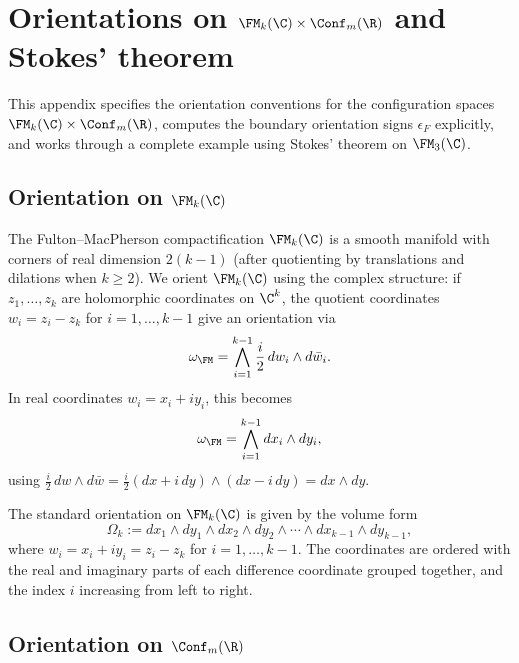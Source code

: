 \section{Orientations on $\FM_k(\C)\times \Conf_m(\R)$ and Stokes' theorem}
\label{app:orientations}

This appendix specifies the orientation conventions for the configuration spaces $\FM_k(\C) \times \Conf_m(\R)$, computes the boundary orientation signs $\epsilon_F$ explicitly, and works through a complete example using Stokes' theorem on $\FM_3(\C)$.

\subsection{Orientation on $\FM_k(\C)$}
\label{subsec:orient-FM}

The Fulton--MacPherson compactification $\FM_k(\C)$ is a smooth manifold with corners of real dimension $2(k-1)$ (after quotienting by translations and dilations when $k \geq 2$). We orient $\FM_k(\C)$ using the complex structure: if $z_1,\ldots,z_k$ are holomorphic coordinates on $\C^k$, the quotient coordinates $w_i = z_i - z_k$ for $i=1,\ldots,k-1$ give an orientation via
\begin{equation}
\label{eq:orient-FM-form}
\omega_{\FM} = \bigwedge_{i=1}^{k-1} \frac{i}{2}\, dw_i \wedge d\bar{w}_i.
\end{equation}
In real coordinates $w_i = x_i + iy_i$, this becomes
\[
\omega_{\FM} = \bigwedge_{i=1}^{k-1} dx_i \wedge dy_i,
\]
using $\frac{i}{2}\,dw \wedge d\bar{w} = \frac{i}{2}(dx+i\,dy)\wedge(dx - i\,dy) = dx\wedge dy$.

\begin{convention}
\label{conv:coord-ordering}
The standard orientation on $\FM_k(\C)$ is given by the volume form
\begin{equation}
\label{eq:vol-FM}
\Omega_k := dx_1 \wedge dy_1 \wedge dx_2 \wedge dy_2 \wedge \cdots \wedge dx_{k-1}\wedge dy_{k-1},
\end{equation}
where $w_i = x_i + iy_i = z_i - z_k$ for $i = 1,\ldots,k-1$. The coordinates are ordered with the real and imaginary parts of each difference coordinate grouped together, and the index $i$ increasing from left to right.
\end{convention}

\subsection{Orientation on $\Conf_m(\R)$}

